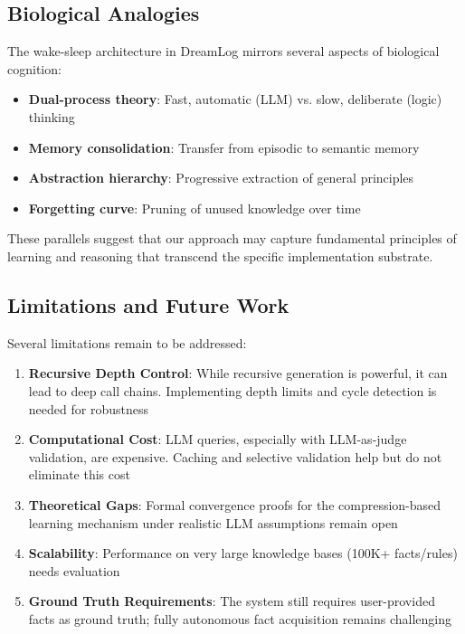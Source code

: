 \documentclass[10pt,conference]{IEEEtran}
\begin{document}
\subsection{Biological Analogies}

The wake-sleep architecture in DreamLog mirrors several aspects of biological cognition:

\begin{itemize}
\item \textbf{Dual-process theory}: Fast, automatic (LLM) vs. slow, deliberate (logic) thinking
\item \textbf{Memory consolidation}: Transfer from episodic to semantic memory
\item \textbf{Abstraction hierarchy}: Progressive extraction of general principles
\item \textbf{Forgetting curve}: Pruning of unused knowledge over time
\end{itemize}

These parallels suggest that our approach may capture fundamental principles of learning and reasoning that transcend the specific implementation substrate.

\subsection{Limitations and Future Work}

Several limitations remain to be addressed:

\begin{enumerate}
\item \textbf{Recursive Depth Control}: While recursive generation is powerful, it can lead to deep call chains. Implementing depth limits and cycle detection is needed for robustness
\item \textbf{Computational Cost}: LLM queries, especially with LLM-as-judge validation, are expensive. Caching and selective validation help but do not eliminate this cost
\item \textbf{Theoretical Gaps}: Formal convergence proofs for the compression-based learning mechanism under realistic LLM assumptions remain open
\item \textbf{Scalability}: Performance on very large knowledge bases (100K+ facts/rules) needs evaluation
\item \textbf{Ground Truth Requirements}: The system still requires user-provided facts as ground truth; fully autonomous fact acquisition remains challenging
\end{enumerate}
\end{document}
